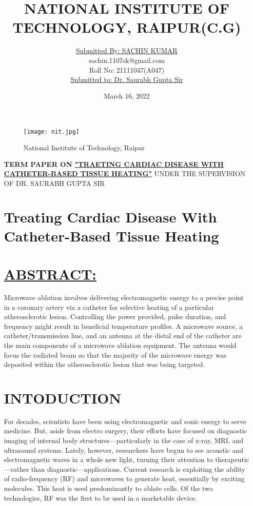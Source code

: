 \documentclass[12pts]{article}
\title{\textbf{NATIONAL INSTITUTE OF TECHNOLOGY, RAIPUR(C.G)}}
\author{\underline{Submitted By: SACHIN KUMAR}\\sachin.1107sk@gmail.com\\Roll No: 21111047(A047)\\ \underline{Submitted to: Dr. Saurabh Gupta Sir}}
\date{March 16, 2022}
\begin{document}
\maketitle

\begin{figure}[h]
\centering
\texttt{[image: nit.jpg]}
\caption{National Institute of Technology, Raipur}
\end{figure}
\centering
\textbf{TERM PAPER ON \underline{"TRAETING CARDIAC DISEASE WITH CATHETER-BASED TISSUE HEATING"}}
\centering
UNDER THE SUPERVISION OF DR. SAURABH GUPTA SIR\\

\clearpage

\section*{Treating Cardiac Disease With Catheter-Based Tissue Heating}
 

\raggedright \section*{\underline{ABSTRACT:}} 
\begin{Large}

Microwave ablation involves delivering electromagnetic energy to a precise point in a coronary artery via a catheter for selective heating of a particular atherosclerotic lesion. Controlling the power provided, pulse duration, and frequency might result in beneficial temperature profiles. A microwave source, a catheter/transmission line, and an antenna at the distal end of the catheter are the main components of a microwave ablation equipment. The antenna would focus the radiated beam so that the majority of the microwave energy was deposited within the atherosclerotic lesion that was being targeted.
\end{Large}

\section*{INTODUCTION}
\begin{flushleft}
\begin{large}
For decades, scientists have been using electromagnetic and sonic energy to serve medicine. But, aside from electro surgery, their efforts have focused on diagnostic imaging of internal body structures—particularly in the case of x-ray, MRI, and ultrasound systems. Lately, however, researchers have begun to see acoustic and electromagnetic waves in a whole new light, turning their attention to therapeutic—rather than diagnostic—applications. Current research is exploiting the ability of radio-frequency (RF) and microwaves to generate heat, essentially by exciting molecules. This heat is used predominantly to ablate cells. Of the two technologies, RF was the first to be used in a marketable device.
\end{large}
\end{flushleft}
\end{document}
